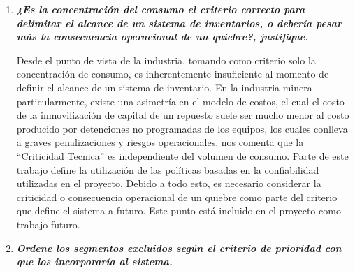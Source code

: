 \documentclass[10pt,a4paper]{article}
\begin{document}
\begin{enumerate}
    \item \textbf{\textit{¿Es la concentración del consumo el criterio correcto para delimitar el alcance de un sistema de inventarios, o debería pesar más la consecuencia operacional de un quiebre?, justifique.}}

Desde el punto de vista de la industria, tomando como criterio solo la concentración de consumo, es inherentemente insuficiente al momento de definir el alcance de un sistema de inventario. 
En la industria minera particularmente, existe una asimetría en el modelo de costos, el cual el costo de la inmovilización de capital de un repuesto suele ser mucho menor al costo producido por detenciones no programadas de los equipos, los cuales conlleva a graves penalizaciones y riesgos operacionales. \cite{louit2011} nos comenta que la ``Criticidad Tecnica'' es independiente del volumen de consumo. Parte de este trabajo define la utilización de las políticas basadas en la confiabilidad utilizadas en el proyecto. 
Debido a todo esto, es necesario considerar la criticidad o consecuencia operacional de un quiebre como parte del criterio que define el sistema a futuro. Este punto está incluido en el proyecto como trabajo futuro.
\\[0.25cm]  

    \item \textbf{\textit{Ordene los segmentos excluidos según el criterio de prioridad con que los incorporaría al sistema.}}


\end{enumerate}
\end{document}
